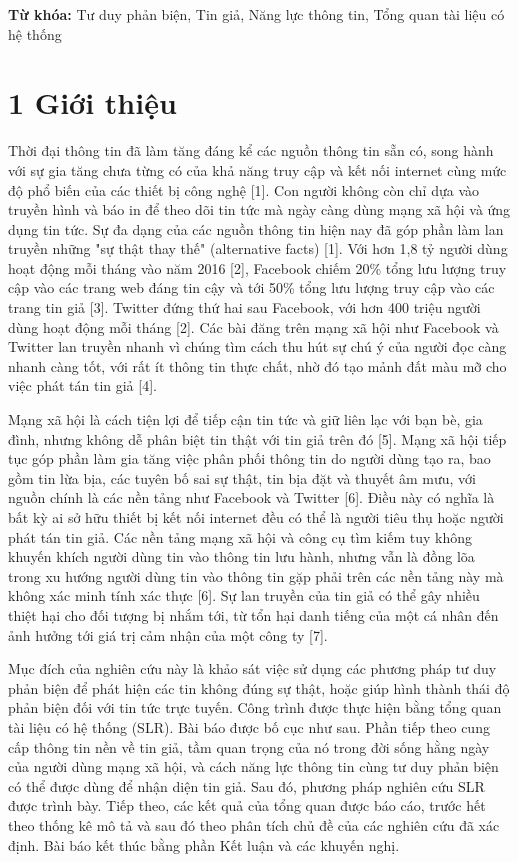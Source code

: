 \textbf{Từ khóa:} Tư duy phản biện, Tin giả, Năng lực thông tin, Tổng quan tài liệu có hệ thống

\section{1 Giới thiệu}

Thời đại thông tin đã làm tăng đáng kể các nguồn thông tin sẵn có, song hành với sự gia tăng chưa từng có của khả năng truy cập và kết nối internet cùng mức độ phổ biến của các thiết bị công nghệ {[}1{]}. Con người không còn chỉ dựa vào truyền hình và báo in để theo dõi tin tức mà ngày càng dùng mạng xã hội và ứng dụng tin tức. Sự đa dạng của các nguồn thông tin hiện nay đã góp phần làm lan truyền những "sự thật thay thế" (alternative facts) {[}1{]}. Với hơn 1,8 tỷ người dùng hoạt động mỗi tháng vào năm 2016 {[}2{]}, Facebook chiếm 20\% tổng lưu lượng truy cập vào các trang web đáng tin cậy và tới 50\% tổng lưu lượng truy cập vào các trang tin giả {[}3{]}. Twitter đứng thứ hai sau Facebook, với hơn 400 triệu người dùng hoạt động mỗi tháng {[}2{]}. Các bài đăng trên mạng xã hội như Facebook và Twitter lan truyền nhanh vì chúng tìm cách thu hút sự chú ý của người đọc càng nhanh càng tốt, với rất ít thông tin thực chất, nhờ đó tạo mảnh đất màu mỡ cho việc phát tán tin giả {[}4{]}.

Mạng xã hội là cách tiện lợi để tiếp cận tin tức và giữ liên lạc với bạn bè, gia đình, nhưng không dễ phân biệt tin thật với tin giả trên đó {[}5{]}. Mạng xã hội tiếp tục góp phần làm gia tăng việc phân phối thông tin do người dùng tạo ra, bao gồm tin lừa bịa, các tuyên bố sai sự thật, tin bịa đặt và thuyết âm mưu, với nguồn chính là các nền tảng như Facebook và Twitter {[}6{]}. Điều này có nghĩa là bất kỳ ai sở hữu thiết bị kết nối internet đều có thể là người tiêu thụ hoặc người phát tán tin giả. Các nền tảng mạng xã hội và công cụ tìm kiếm tuy không khuyến khích người dùng tin vào thông tin lưu hành, nhưng vẫn là đồng lõa trong xu hướng người dùng tin vào thông tin gặp phải trên các nền tảng này mà không xác minh tính xác thực {[}6{]}. Sự lan truyền của tin giả có thể gây nhiều thiệt hại cho đối tượng bị nhắm tới, từ tổn hại danh tiếng của một cá nhân đến ảnh hưởng tới giá trị cảm nhận của một công ty {[}7{]}.

Mục đích của nghiên cứu này là khảo sát việc sử dụng các phương pháp tư duy phản biện để phát hiện các tin không đúng sự thật, hoặc giúp hình thành thái độ phản biện đối với tin tức trực tuyến. Công trình được thực hiện bằng tổng quan tài liệu có hệ thống (SLR). Bài báo được bố cục như sau. Phần tiếp theo cung cấp thông tin nền về tin giả, tầm quan trọng của nó trong đời sống hằng ngày của người dùng mạng xã hội, và cách năng lực thông tin cùng tư duy phản biện có thể được dùng để nhận diện tin giả. Sau đó, phương pháp nghiên cứu SLR được trình bày. Tiếp theo, các kết quả của tổng quan được báo cáo, trước hết theo thống kê mô tả và sau đó theo phân tích chủ đề của các nghiên cứu đã xác định. Bài báo kết thúc bằng phần Kết luận và các khuyến nghị.

